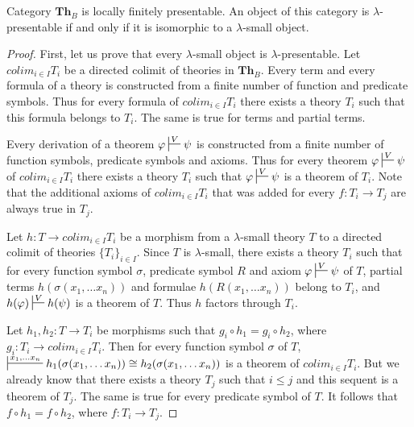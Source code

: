 \documentclass[reqno]{amsart}
\theoremstyle{definition}
\theoremstyle{remark}
\newcommand{\cat}[1]{\mathbf{#1}}
\newcommand{\Th}{\cat{Th}}
\numberwithin{figure}{section}
\begin{document}
\begin{prop}
Category $\Th_B$ is locally finitely presentable.
An object of this category is $\lambda$-presentable if and only if it is isomorphic to a $\lambda$-small object.
\end{prop}
\begin{proof}
First, let us prove that every $\lambda$-small object is $\lambda$-presentable.
Let $colim_{i \in I} T_i$ be a directed colimit of theories in $\Th_B$.
Every term and every formula of a theory is constructed from a finite number of function and predicate symbols.
Thus for every formula of $colim_{i \in I} T_i$ there exists a theory $T_i$ such that this formula belongs to $T_i$.
The same is true for terms and partial terms.

Every derivation of a theorem $\varphi \sststile{}{V} \psi$ is constructed from a finite number of function symbols, predicate symbols and axioms.
Thus for every theorem $\varphi \sststile{}{V} \psi$ of $colim_{i \in I} T_i$ there exists a theory $T_i$ such that $\varphi \sststile{}{V} \psi$ is a theorem of $T_i$.
Note that the additional axioms of $colim_{i \in I} T_i$ that was added for every $f : T_i \to T_j$ are always true in $T_j$.

Let $h : T \to colim_{i \in I} T_i$ be a morphism from a $\lambda$-small theory $T$ to a directed colimit of theories $\{ T_i \}_{i \in I}$.
Since $T$ is $\lambda$-small, there exists a theory $T_i$ such that for every function symbol $\sigma$, predicate symbol $R$ and axiom $\varphi \sststile{}{V} \psi$ of $T$,
partial terms $h(\sigma(x_1, \ldots x_n))$ and formulae $h(R(x_1, \ldots x_n))$ belong to $T_i$, and $h(\varphi) \sststile{}{V} h(\psi)$ is a theorem of $T$.
Thus $h$ factors through $T_i$.

Let $h_1,h_2 : T \to T_i$ be morphisms such that $g_i \circ h_1 = g_i \circ h_2$, where $g_i : T_i \to colim_{i \in I} T_i$.
Then for every function symbol $\sigma$ of $T$, $\sststile{}{x_1, \ldots x_n} h_1(\sigma(x_1, \ldots x_n)) \cong h_2(\sigma(x_1, \ldots x_n))$ is a theorem of $colim_{i \in I} T_i$.
But we already know that there exists a theory $T_j$ such that $i \leq j$ and this sequent is a theorem of $T_j$.
The same is true for every predicate symbol of $T$.
It follows that $f \circ h_1 = f \circ h_2$, where $f : T_i \to T_j$.


\end{proof}
\end{document}
